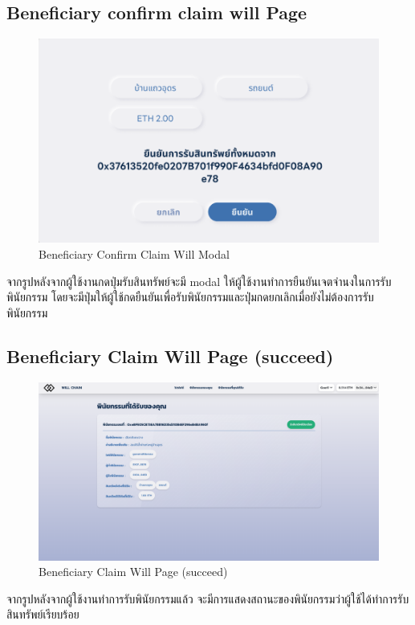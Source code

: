 \documentclass[12pt,oneside,openright,a4paper]{cpe-thai-project}
\begin{document}
\clearpage
\subsection{Beneficiary confirm claim will Page}
	\begin{figure}[!thb]
			\centering
			\includegraphics[scale=0.3]{claimWillConfirm4}
			\caption{Beneficiary Confirm Claim Will Modal }
		\end{figure}
		\FloatBarrier
\tab จากรูปหลังจากผู้ใช้งานกดปุ่มรับสินทรัพย์จะมี modal ให้ผู้ใช้งานทำการยืนยันเจตจำนงในการรับพินัยกรรม โดยจะมีปุ่มให้ผู้ใช้กดยืนยันเพื่อรับพินัยกรรมและปุ่มกดยกเลิกเมื่อยังไม่ต้องการรับพินัยกรรม

\subsection{Beneficiary Claim Will Page (succeed) }
	\begin{figure}[!thb]
			\centering
			\includegraphics[scale=0.2]{claimWillSuc4}
			\caption{Beneficiary Claim Will Page (succeed)}
		\end{figure}
		\FloatBarrier
\tab จากรูปหลังจากผู้ใช้งานทำการรับพินัยกรรมแล้ว จะมีการแสดงสถานะของพินัยกรรมว่าผู้ใช้ได้ทำการรับสินทรัพย์เรียบร้อย
\end{document}
